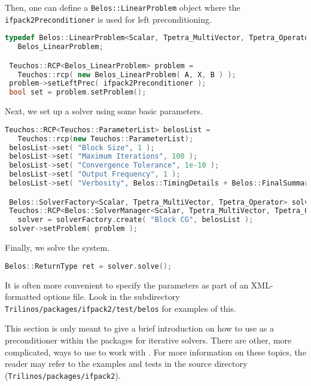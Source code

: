 Then, one can define a \texttt{Belos::LinearProblem} object where the
\texttt{ifpack2Preconditioner} is used for left preconditioning.
\begin{lstlisting}[language=C++]
 typedef Belos::LinearProblem<Scalar, Tpetra_MultiVector, Tpetra_Operator>
   Belos_LinearProblem;

 Teuchos::RCP<Belos_LinearProblem> problem =
   Teuchos::rcp( new Belos_LinearProblem( A, X, B ) );
 problem->setLeftPrec( ifpack2Preconditioner );
 bool set = problem.setProblem();
\end{lstlisting}

Next, we set up a \belos{} solver using some basic parameters.
\begin{lstlisting}[language=C++]
 Teuchos::RCP<Teuchos::ParameterList> belosList =
   Teuchos::rcp(new Teuchos::ParameterList);
 belosList->set( "Block Size", 1 );
 belosList->set( "Maximum Iterations", 100 );
 belosList->set( "Convergence Tolerance", 1e-10 );
 belosList->set( "Output Frequency", 1 );
 belosList->set( "Verbosity", Belos::TimingDetails + Belos::FinalSummary );

 Belos::SolverFactory<Scalar, Tpetra_MultiVector, Tpetra_Operator> solverFactory;
 Teuchos::RCP<Belos::SolverManager<Scalar, Tpetra_MultiVector, Tpetra_Operator> >
   solver = solverFactory.create( "Block CG", belosList );
 solver->setProblem( problem );
\end{lstlisting}

Finally, we solve the system.
\begin{lstlisting}[language=C++]
 Belos::ReturnType ret = solver.solve();
\end{lstlisting}

It is often more convenient to specify the parameters as part of an XML-formatted options file.
Look in the subdirectory {\tt Trilinos/packages/ifpack2/test/belos} for examples of this.

This section is only meant to give a brief introduction on how to use
\ifpacktwo{} as a preconditioner within the \trilinos{} packages for iterative
solvers. There are other, more complicated, ways to use to work with
\ifpacktwo{}. For more information on these topics, the reader may refer to the
examples and tests in the \ifpacktwo{} source directory
(\texttt{Trilinos/packages/ifpack2}).

